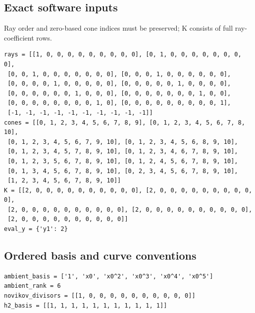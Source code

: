 \documentclass[10pt,a4paper]{article}
\begin{document}
\subsection*{Exact software inputs}
Ray order and zero-based cone indices must be preserved; K consists of full ray-coefficient rows.
\begin{lstlisting}
rays = [[1, 0, 0, 0, 0, 0, 0, 0, 0, 0], [0, 1, 0, 0, 0, 0, 0, 0, 0, 0],
 [0, 0, 1, 0, 0, 0, 0, 0, 0, 0], [0, 0, 0, 1, 0, 0, 0, 0, 0, 0],
 [0, 0, 0, 0, 1, 0, 0, 0, 0, 0], [0, 0, 0, 0, 0, 1, 0, 0, 0, 0],
 [0, 0, 0, 0, 0, 0, 1, 0, 0, 0], [0, 0, 0, 0, 0, 0, 0, 1, 0, 0],
 [0, 0, 0, 0, 0, 0, 0, 0, 1, 0], [0, 0, 0, 0, 0, 0, 0, 0, 0, 1],
 [-1, -1, -1, -1, -1, -1, -1, -1, -1, -1]]
cones = [[0, 1, 2, 3, 4, 5, 6, 7, 8, 9], [0, 1, 2, 3, 4, 5, 6, 7, 8, 10],
 [0, 1, 2, 3, 4, 5, 6, 7, 9, 10], [0, 1, 2, 3, 4, 5, 6, 8, 9, 10],
 [0, 1, 2, 3, 4, 5, 7, 8, 9, 10], [0, 1, 2, 3, 4, 6, 7, 8, 9, 10],
 [0, 1, 2, 3, 5, 6, 7, 8, 9, 10], [0, 1, 2, 4, 5, 6, 7, 8, 9, 10],
 [0, 1, 3, 4, 5, 6, 7, 8, 9, 10], [0, 2, 3, 4, 5, 6, 7, 8, 9, 10],
 [1, 2, 3, 4, 5, 6, 7, 8, 9, 10]]
K = [[2, 0, 0, 0, 0, 0, 0, 0, 0, 0, 0], [2, 0, 0, 0, 0, 0, 0, 0, 0, 0, 0],
 [2, 0, 0, 0, 0, 0, 0, 0, 0, 0, 0], [2, 0, 0, 0, 0, 0, 0, 0, 0, 0, 0],
 [2, 0, 0, 0, 0, 0, 0, 0, 0, 0, 0]]
eval_y = {'y1': 2}
\end{lstlisting}
\subsection*{Ordered basis and curve conventions}
\begin{lstlisting}
ambient_basis = ['1', 'x0', 'x0^2', 'x0^3', 'x0^4', 'x0^5']
ambient_rank = 6
novikov_divisors = [[1, 0, 0, 0, 0, 0, 0, 0, 0, 0, 0]]
h2_basis = [[1, 1, 1, 1, 1, 1, 1, 1, 1, 1, 1]]
\end{lstlisting}
\end{document}
